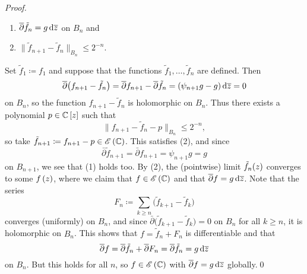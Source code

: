 \documentclass[../Moduli_Spaces_of_Riemann_Surfaces.tex]{subfiles}
\begin{document}
\begin{proof}
        \begin{enumerate}
            \item $\overline{\partial}\tilde{f}_n=g\,\mathrm{d}\overline{z}$ on $B_n$ and
                \vspace{-0.05in}
            \item $\big\|\tilde{f}_{n+1}-\tilde{f}_n\big\|_{B_n}\!\leq 2^{-n}$.
        \end{enumerate}
        Set $\tilde{f}_1\coloneqq f_1$ and suppose that the functions $\tilde{f}_1,\dots,\tilde{f}_n$ are defined. Then
        \begin{equation*}
            \overline{\partial}\big(f_{n+1}-\tilde{f}_n\big)=\overline{\partial}f_{n+1}-\overline\partial\tilde{f}_n=\left(\psi_{n+1}g-g\right)\mathrm{d}\overline{z}=0
        \end{equation*}
        on $B_n$, so the function $f_{n+1}-\tilde{f}_n$ is holomorphic on $B_n$. Thus there exists a polynomial $p\in\mathbb{C}\left[z\right]$ such that
        \begin{equation*}
            \big\|f_{n+1}-\tilde{f}_n-p\big\|_{B_n}\!\leq 2^{-n},
        \end{equation*}
        so take $\tilde{f}_{n+1}\coloneqq f_{n+1}-p\in\mathscr{E}\left(\mathbb{C}\right)$. This satisfies (2), and since
        \begin{equation*}
            \bar{\partial}\tilde{f}_{n+1}=\bar{\partial}f_{n+1}=\psi_{n+1}g=g
        \end{equation*}
        on $B_{n+1}$, we see that (1) holds too. By (2), the (pointwise) limit $\tilde{f}_n\!\left(z\right)$ converges to some $f\left(z\right)$, where we claim that  $f\in\mathscr{E}\left(\mathbb{C}\right)$ and that $\overline{\partial}f=g\,\mathrm{d}\overline{z}$. Note that the series
        \begin{equation*}
            F_n\coloneqq\sum_{k\geq n}\big(\tilde{f}_{k+1}-\tilde{f}_k\big)
        \end{equation*}
        converges (uniformly) on $B_n$, and since $\bar{\partial}\big(\tilde{f}_{k+1}-\tilde{f}_k\big)=0$ on $B_n$ for all $k\geq n$, it is holomorphic on $B_n$. This shows that $f=\tilde{f}_n+F_n$ is differentiable and that
        \begin{equation*}
            \overline{\partial}f=\overline{\partial}\tilde{f}_n+\overline{\partial}F_n=\overline{\partial}\tilde{f}_n=g\,\mathrm{d}\overline{z}
        \end{equation*}
        on $B_n$. But this holds for all $n$, so $f\in\mathscr{E}\left(\mathbb{C}\right)$ with $\overline{\partial}f=g\,\mathrm{d}\overline{z}$ globally.\qed
    \end{proof}
\end{document}
